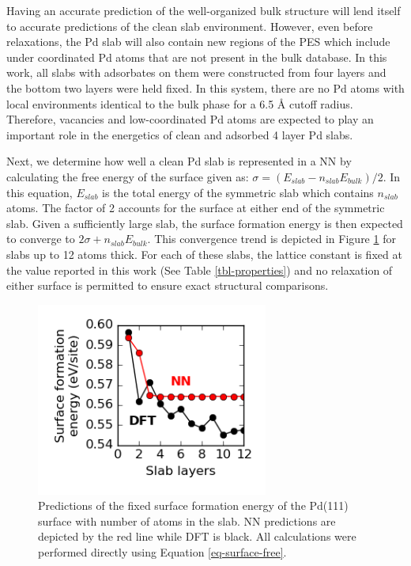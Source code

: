\documentclass[12pt]{cmuthesis}
\begin{document}
Having an accurate prediction of the well-organized bulk structure will lend itself to accurate predictions of the clean slab environment. However, even before relaxations, the Pd slab will also contain new regions of the PES which include under coordinated Pd atoms that are not present in the bulk database. In this work, all slabs with adsorbates on them were constructed from four layers and the bottom two layers were held fixed. In this system, there are no Pd atoms with local environments identical to the bulk phase for a 6.5 \AA{} cutoff radius. Therefore, vacancies and low-coordinated Pd atoms are expected to play an important role in the energetics of clean and adsorbed 4 layer Pd slabs.

Next, we determine how well a clean Pd slab is represented in a NN by calculating the free energy of the surface given as: \(\sigma = (E_{slab} - n_{slab} E_{bulk})/2\). In this equation, \(E_{slab}\) is the total energy of the symmetric slab which contains \(n_{slab}\) atoms. The factor of 2 accounts for the surface at either end of the symmetric slab. Given a sufficiently large slab, the surface formation energy is then expected to converge to \(2 \sigma + n_{slab} E_{bulk}\). This convergence trend is depicted in Figure \ref{fig-surface-energy} for slabs up to 12 atoms thick. For each of these slabs, the lattice constant is fixed at the value reported in this work (See Table \ref{tbl-properties}) and no relaxation of either surface is permitted to ensure exact structural comparisons.

\begin{figure}[htbp]
\centering
\includegraphics[width=3in]{./images/surface-energy.png}
\caption{\label{fig-surface-energy}
Predictions of the fixed surface formation energy of the Pd(111) surface with number of atoms in the slab. NN predictions are depicted by the red line while DFT is black. All calculations were performed directly using Equation \ref{eq-surface-free}.}
\end{figure}
\end{document}
